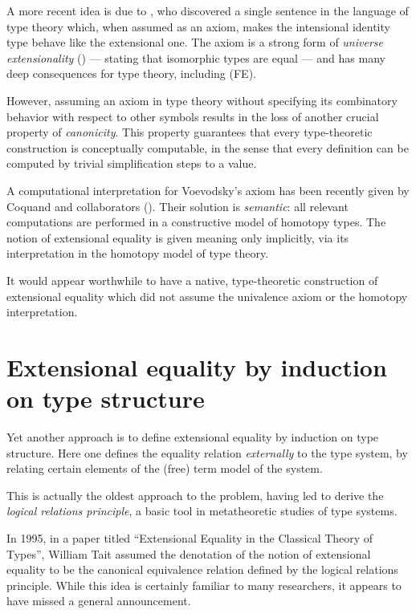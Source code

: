 \documentclass[10pt]{article}
\begin{document}
A more recent idea is due to \cite{hlc},
who discovered a single sentence in the language of type theory
which, when assumed as an axiom, makes the intensional identity type
behave like the extensional one.  The axiom is a strong form of \emph{universe
extensionality} (\cite{groupoid}) --- stating that isomorphic types
are equal --- and has many deep consequences for type theory,
including (FE).

However, assuming an axiom in type theory without specifying
its combinatory behavior with respect to other symbols
results in the loss of another crucial property of \emph{canonicity}.
This property guarantees that every type-theoretic construction
is conceptually computable, in the sense that every definition can
be computed by trivial simplification steps to a value.

A computational interpretation for Voevodsky's axiom has been recently
given by Coquand and collaborators (\cite{cubes}).  Their solution is
\emph{semantic}:
all relevant computations are performed in
a constructive model of homotopy types.
The notion of extensional equality is given meaning only implicitly,
via its interpretation in the homotopy model of type theory.

It would appear worthwhile to have a native, type-theoretic construction
of extensional equality which did not assume the univalence axiom or
the homotopy interpretation.  

\section{Extensional equality by induction on type structure}

Yet another approach is to define
extensional equality by induction on type structure.
Here one defines the equality relation
\emph{externally} to the type system, by relating
certain elements of the (free) term model of the system.

This is actually the oldest approach to the problem,
having led \cite{Gandy} to derive the
\emph{logical relations principle}, a basic tool in metatheoretic
studies of type systems.

In 1995, in a paper titled ``Extensional Equality in the Classical
Theory of Types'', William Tait assumed the denotation of the notion of
extensional equality to be the canonical equivalence relation
defined by the logical relations principle.  While this idea is
certainly familiar to many researchers,
it appears to have missed a general announcement.
\end{document}
